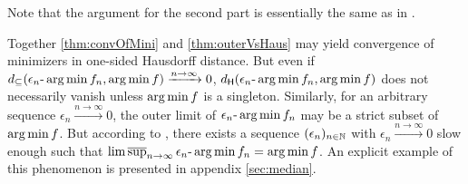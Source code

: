 %
Note that the argument for the second part is essentially the same as in \cite[proof of Theorem A.4]{huckemann11}.
%
\begin{remark}\label{rem:epsilon_argmin}
Together \autoref{thm:convOfMini} and \autoref{thm:outerVsHaus} may yield convergence of minimizers in one-sided Hausdorff distance. But even if $d_{\subseteq}(\epsilon_n\text{-}\operatorname*{arg\,min} f_n, \operatorname*{arg\,min} f) \xrightarrow{n\to\infty} 0$, $d_{\mathsf{H}}(\epsilon_n\text{-}\operatorname*{arg\,min} f_n, \operatorname*{arg\,min} f)$ does not necessarily vanish unless $\operatorname*{arg\,min} f$ is a singleton.
Similarly, for an arbitrary sequence $\epsilon_n \xrightarrow{n\to\infty}0$, the outer limit of $\epsilon_n\text{-}\operatorname*{arg\,min} f_n$ may be a strict subset of $\operatorname*{arg\,min} f$.
But according to \cite[Theorem 7.31 (c)]{rockafellar98}, there exists a sequence $(\epsilon_n)_{n\in\mathbb{N}}$ with $\epsilon_n\xrightarrow{n\to\infty}0$ slow enough such that $\operatorname*{lim\, \overline{sup}}_{n\to\infty}\epsilon_n\text{-}\operatorname*{arg\,min} f_n = \operatorname*{arg\,min} f$. An explicit example of this phenomenon is presented in appendix \ref{sec:median}.
\end{remark}
%